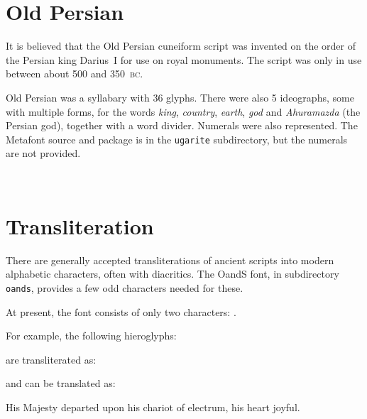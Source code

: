 \documentclass{article}
\newcommand{\BC}{\textsc{bc}}
\begin{document}
\section{Old Persian}

    It is believed that the Old Persian cuneiform script was invented on
the order of the Persian king Darius~I for use on royal monuments.
The script was only in use between about 500 and 350~\BC.

   Old Persian was a syllabary with 36 glyphs. There were also 5 ideographs,
some with multiple forms, 
for the words \textit{king}, \textit{country}, \textit{earth}, \textit{god}
and \textit{Ahuramazda} (the Persian god), together with a word divider.
Numerals were also represented. 
The Metafont source and package is in the \texttt{ugarite} subdirectory, but
the numerals are not provided.

\begin{center}
\copsnfamily
\Oa\ \Oi\ \Ou\ \Oka\ \Oku\ 
\Oxa\ \Oga\ \Ogu\ \Oca\ \Oja\ 
\Oji\ \Ota\ \Otu\ \Otha\ \Occa\ 
\Oda\ \Odi\ \Odu\ \Ona\ \Onu\ 
\Opa\ \Ofa\ \Oba\ \Oma\ \Omi\ 
\Omu\ \Oya\ \Ora\ \Oru\ \Ola\ 
\Ova\ \Ovi\ \Osa\ \Osva\ \Oza\ 
\Oha\ 
\Oking\ \Ocountrya\ \Ocountryb\ \Oearth\ \Ogod\ 
\OAura\ \OAurb\ \OAurc\ 
\Owd
\end{center}


\clearpage
\section{Transliteration}

    There are generally accepted transliterations of ancient scripts
into modern alphabetic characters, often with diacritics. The
OandS font, in subdirectory \texttt{oands}, provides a few odd 
characters needed for these.

    At present, the font consists of only two characters: .

    For example, the following hieroglyphs:
\begin{center}
\renewcommand{\baselinestretch}{1.2}
\pmglyph{\HU\Hw\HL\HJ\Hf-\Hq:\Hvbar-\HR:{\Hr:\Hr}-\Hy-\Ht:\HN-\Hf-\Hn:\Ht-\Hc\Hm\Hv-\HG:\Hvbar-\Hf\HZ\Hw\HV}
\end{center}
are transliterated as:
\begin{center}
\end{center}
and can be translated as:
\begin{center}
His Majesty departed upon his chariot of electrum, his heart joyful.
\end{center}
\end{document}

